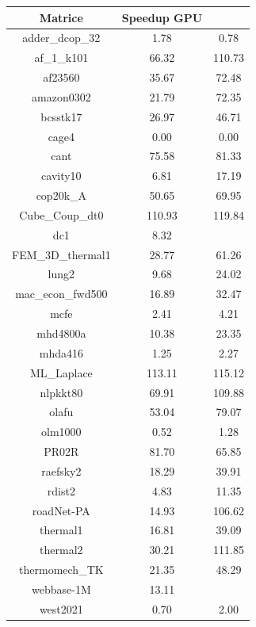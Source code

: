 \documentclass[12pt,halfline,a4paper]{ouparticle}
\begin{document}
\begin{center}
\begin{tabular}{|| c | c | c ||} 
\hline
Matrice & Speedup GPU \\ [1ex]
\hline
adder\_dcop\_32 & 1.78 & 0.78 \\
\hline
af\_1\_k101 & 66.32 & 110.73 \\
\hline
af23560 & 35.67 & 72.48 \\
\hline
amazon0302 & 21.79 & 72.35 \\
\hline
bcsstk17 & 26.97 & 46.71 \\
\hline
cage4 & 0.00 & 0.00 \\
\hline
cant & 75.58 & 81.33 \\
\hline
cavity10 & 6.81 & 17.19 \\
\hline
cop20k\_A & 50.65 & 69.95 \\
\hline
Cube\_Coup\_dt0 & 110.93 & 119.84 \\
\hline
dc1 & 8.32 &  \\
\hline
FEM\_3D\_thermal1 & 28.77 & 61.26 \\
\hline
lung2 & 9.68 & 24.02 \\
\hline
mac\_econ\_fwd500 & 16.89 & 32.47 \\
\hline
mcfe & 2.41 & 4.21 \\
\hline
mhd4800a & 10.38 & 23.35 \\
\hline
mhda416 & 1.25 & 2.27 \\
\hline
ML\_Laplace & 113.11 & 115.12 \\
\hline
nlpkkt80 & 69.91 & 109.88 \\
\hline
olafu & 53.04 & 79.07 \\
\hline
olm1000 & 0.52 & 1.28 \\
\hline
PR02R & 81.70 & 65.85 \\
\hline
raefsky2 & 18.29 & 39.91 \\
\hline
rdist2 & 4.83 & 11.35 \\
\hline
roadNet-PA & 14.93 & 106.62 \\
\hline
thermal1 & 16.81 & 39.09 \\
\hline
thermal2 & 30.21 & 111.85 \\
\hline
thermomech\_TK & 21.35 & 48.29 \\
\hline
webbase-1M & 13.11 &  \\
\hline
west2021 & 0.70 & 2.00 \\
\hline
\end{tabular}
\end{center}
\end{document}
